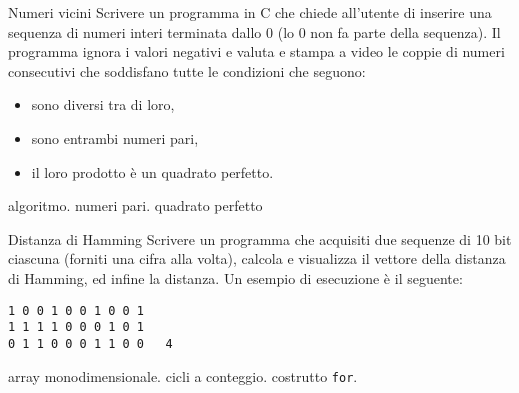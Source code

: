 \begin{exrev}{Numeri vicini}
Scrivere un programma in C che chiede all'utente di inserire una sequenza di numeri interi terminata dallo 0 (lo 0 non fa parte della sequenza). Il programma ignora i valori negativi e valuta e stampa a video le coppie di numeri consecutivi che soddisfano tutte le condizioni che seguono:\begin{itemize}
\item sono diversi tra di loro,
\item sono entrambi numeri pari,
\item il loro prodotto \`e un quadrato perfetto.
\end{itemize}


\begin{tags}
algoritmo. numeri pari. quadrato perfetto
\end{tags}



\end{exrev}

\begin{exrev}{Distanza di Hamming}
Scrivere un programma che acquisiti due sequenze di 10 bit ciascuna (forniti una cifra alla volta), calcola e visualizza il vettore della distanza di Hamming, ed infine la distanza. Un esempio di esecuzione \`e il seguente:
\begin{verbatim}
1 0 0 1 0 0 1 0 0 1
1 1 1 1 0 0 0 1 0 1
0 1 1 0 0 0 1 1 0 0   4
\end{verbatim}

\begin{tags}
array monodimensionale. cicli a conteggio. costrutto \texttt{for}.
\end{tags}


\end{exrev}

